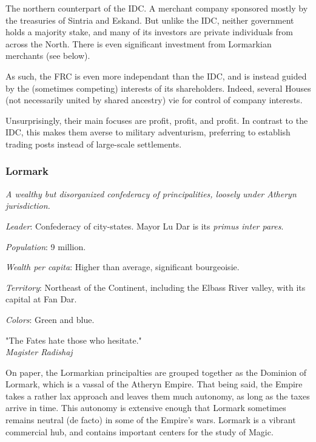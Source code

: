 The northern counterpart of the IDC. A merchant company sponsored mostly by the treasuries of Sintria and Eskand. But unlike the IDC, neither government holds a majority stake, and many of its investors are private individuals from across the North. There is even significant investment from Lormarkian merchants (see below).

As such, the FRC is even more independant than the IDC, and is instead guided by the (sometimes competing) interests of its shareholders. Indeed, several Houses (not necessarily united by shared ancestry) vie for control of company interests.

Unsurprisingly, their main focuses are profit, profit, and profit. In contrast to the IDC, this makes them averse to military adventurism, preferring to establish trading posts instead of large-scale settlements.



\subsubsection{Lormark}

\textit{A wealthy but disorganized confederacy of principalities, loosely under Atheryn jurisdiction.}

\textit{Leader}: Confederacy of city-states. Mayor Lu Dar is its \textit{primus inter pares}.

\textit{Population}: 9 million.

\textit{Wealth per capita}: Higher than average, significant bourgeoisie.

\textit{Territory}: Northeast of the Continent, including the Elbass River valley, with its capital at Fan Dar.
    
\textit{Colors}: Green and blue.


\begin{rpg-quotebox}
"The Fates hate those who hesitate." \\ \textendash \textit{Magister Radishaj}
\end{rpg-quotebox}


On paper, the Lormarkian principalties are grouped together as the Dominion of Lormark, which is a vassal of the Atheryn Empire. That being said, the Empire takes a rather lax approach and leaves them much autonomy, as long as the taxes arrive in time. This autonomy is extensive enough that Lormark sometimes remains neutral (de facto) in some of the Empire's wars. Lormark is a vibrant commercial hub, and contains important centers for the study of Magic.

